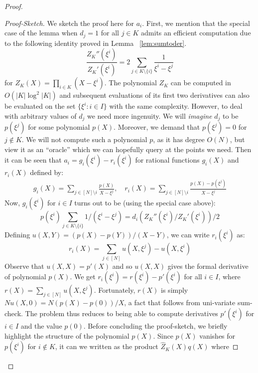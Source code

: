 \begin{proof}
    \begin{proof}[Proof-Sketch]
        We sketch the proof here for $a_i$.
        First, we mention that the special case of the lemma when $d_j=1$ for all $j\in K$ admits an efficient computation due to the following identity
        proved in Lemma ~\ref{lem:sumtoder}.
        \begin{equation*}
            \frac{Z_K''(\xi^i)}{Z_K'(\xi^i)} = 2\sum_{j\in K\setminus \{i\}}\frac{1}{\xi^i-\xi^j}
        \end{equation*}
        for $Z_K(X)=\prod_{i\in K}(X-\xi^i)$. The polynomial $Z_K$ can be computed in $O(|K|\log^2|K|)$ and subsequent evaluations of its first two
        derivatives can also be evaluated on the set $\{\xi^i: i\in I\}$ with the same complexity. However, to deal with arbitrary values of $d_j$ we
        need more ingenuity. We will {\em imagine} $d_j$ to be $p(\xi^j)$ for some polynomial $p(X)$. Moreover, we demand that $p(\xi^j)=0$ for $j\not\in K$.
        We will not compute such a polynomial $p$, as it has degree $O(N)$, but view it as an ``oracle'' which we can hopefully query at the points we need.
        Then it can be seen that $a_i=g_i(\xi^i) - r_i(\xi^i)$ for rational functions $g_i(X)$ and $r_i(X)$ defined by:
        \begin{align}\label{eq:rat-fun-f}
        g_i(X) =\sum_{j\in [N]\setminus i}\frac{p(X)}{X-\xi^j},\quad
        r_i(X) =\sum_{j\in [N]\setminus i} \frac{p(X)-p(\xi^j)}{X-\xi^j}
        \end{align}
        Now, $g_i(\xi^i)$ for $i\in I$ turns out to be (using the special case above):
        $$p(\xi^i)\sum_{j\in K\setminus \{i\}} 1/(\xi^i-\xi^j)=d_i(Z_K''(\xi^i)/Z_K'(\xi^i))/2$$
        Defining $u(X,Y)=(p(X)-p(Y))/(X-Y)$, we can write $r_i(\xi^i)$ as:
        \begin{equation}
            r_i(X) = \sum_{j\in [N]}u(X,\xi^j) - u(X,\xi^i)
        \end{equation}
        Observe that $u(X,X)=p'(X)$ and so $u(X,X)$ gives the formal derivative of polynomial $p(X)$. We get
        $r_i(\xi^i)=r(\xi^i)-p'(\xi^i)$ for all $i\in I$, where $r(X)=\sum_{j\in [N]}u(X,\xi^j)$. Fortunately,
        $r(X)$ is simply $Nu(X,0)=N(p(X) - p(0))/X$, a fact that follows from uni-variate sum-check. The problem
        thus reduces to being able to compute derivatives $p'(\xi^i)$ for $i\in I$ and the value $p(0)$. Before
        concluding the proof-sketch, we briefly highlight the structure of the polynomial $p(X)$. Since $p(X)$
        vanishes for $p(\xi^i)$ for $i\not\in K$, it can we written as the product $\widehat{Z}_K(X)q(X)$ where

\end{proof}
\end{proof}
